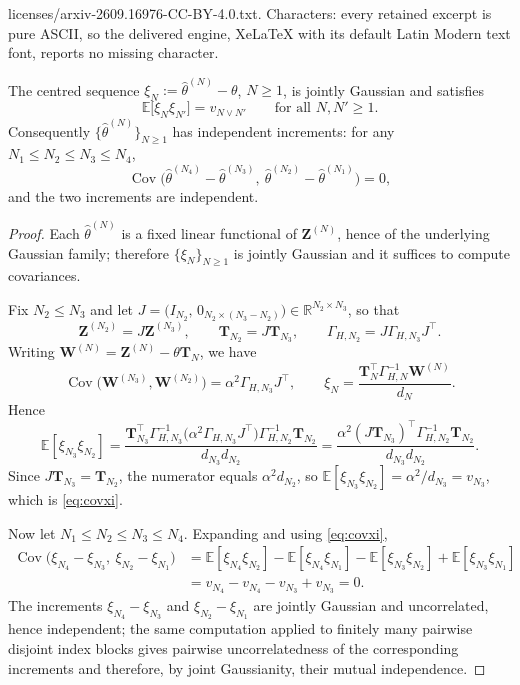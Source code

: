 \documentclass[10pt,a4paper]{amsart}
\DeclareMathOperator{\Cov}{Cov}
\newcommand{\E}{\mathbb{E}}
\newcommand{\R}{\mathbb{R}}
\newcommand{\bT}{\mathbf{T}}
\newcommand{\bW}{\mathbf{W}}
\newcommand{\bZ}{\mathbf{Z}}
\begin{document}
licenses/arxiv-2609.16976-CC-BY-4.0.txt. Characters: every retained excerpt is pure ASCII, so the delivered engine, XeLaTeX with its default Latin Modern text font, reports no missing character.
\begin{theorem}\label{th:indincr}
The centred sequence $\xi_N:=\widehat\theta^{(N)}-\theta$, $N\ge1$, is jointly Gaussian
and satisfies
\begin{equation}\label{eq:covxi}
  \E\bigl[\xi_N\xi_{N'}\bigr]=v_{N\vee N'}\qquad\text{for all }N,N'\ge1 .
\end{equation}
Consequently $\{\widehat\theta^{(N)}\}_{N\ge1}$ has independent increments: for any
$N_1\le N_2\le N_3\le N_4$,
\[
  \Cov\bigl(\widehat\theta^{(N_4)}-\widehat\theta^{(N_3)},\
            \widehat\theta^{(N_2)}-\widehat\theta^{(N_1)}\bigr)=0,
\]
and the two increments are independent.
\end{theorem}

\begin{proof}
Each $\widehat\theta^{(N)}$ is a fixed linear functional of $\bZ^{(N)}$, hence of the
underlying Gaussian family; therefore $\{\xi_N\}_{N\ge1}$ is jointly Gaussian and it
suffices to compute covariances.

Fix $N_2\le N_3$ and let $J=\bigl(I_{N_2},\,0_{N_2\times(N_3-N_2)}\bigr)
\in\R^{N_2\times N_3}$, so that
\[
  \bZ^{(N_2)}=J\bZ^{(N_3)},\qquad \bT_{N_2}=J\bT_{N_3},\qquad
  \Gamma_{H,N_2}=J\Gamma_{H,N_3}J^{\top} .
\]
Writing $\bW^{(N)}=\bZ^{(N)}-\theta\bT_N$, we have
\[
  \Cov\bigl(\bW^{(N_3)},\bW^{(N_2)}\bigr)=\alpha^{2}\Gamma_{H,N_3}J^{\top},
  \qquad
  \xi_N=\frac{\bT_N^{\top}\Gamma_{H,N}^{-1}\bW^{(N)}}{d_N}.
\]
Hence
\[
  \E[\xi_{N_3}\xi_{N_2}]
  =\frac{\bT_{N_3}^{\top}\Gamma_{H,N_3}^{-1}
        \bigl(\alpha^{2}\Gamma_{H,N_3}J^{\top}\bigr)\Gamma_{H,N_2}^{-1}\bT_{N_2}}
        {d_{N_3}d_{N_2}}
  =\frac{\alpha^{2}(J\bT_{N_3})^{\top}\Gamma_{H,N_2}^{-1}\bT_{N_2}}{d_{N_3}d_{N_2}} .
\]
Since $J\bT_{N_3}=\bT_{N_2}$, the numerator equals $\alpha^{2}d_{N_2}$, so
$\E[\xi_{N_3}\xi_{N_2}]=\alpha^{2}/d_{N_3}=v_{N_3}$, which is \eqref{eq:covxi}.

Now let $N_1\le N_2\le N_3\le N_4$. Expanding and using \eqref{eq:covxi},
\[
\begin{aligned}
  \Cov\bigl(\xi_{N_4}-\xi_{N_3},\ \xi_{N_2}-\xi_{N_1}\bigr)
  &=\E[\xi_{N_4}\xi_{N_2}]-\E[\xi_{N_4}\xi_{N_1}]
    -\E[\xi_{N_3}\xi_{N_2}]+\E[\xi_{N_3}\xi_{N_1}]\\
  &=v_{N_4}-v_{N_4}-v_{N_3}+v_{N_3}=0 .
\end{aligned}
\]
The increments $\xi_{N_4}-\xi_{N_3}$ and $\xi_{N_2}-\xi_{N_1}$ are jointly Gaussian and
uncorrelated, hence independent; the same computation applied to finitely many pairwise
disjoint index blocks gives pairwise uncorrelatedness of the corresponding increments and
therefore, by joint Gaussianity, their mutual independence.
\end{proof}
\end{document}
